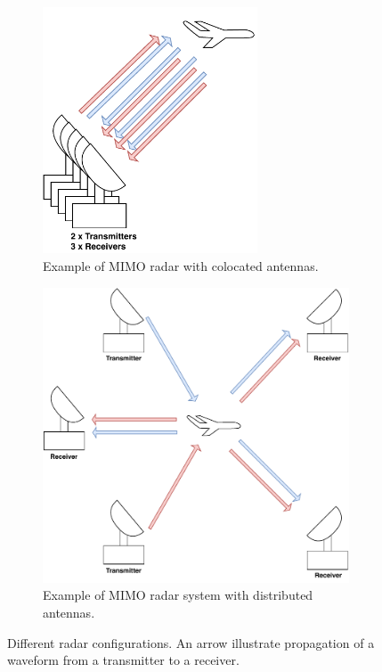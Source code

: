 \documentclass[english, 12pt, a4paper, elec, utf8, a-1b, online]{aaltothesis}
\numberwithin{equation}{section}
\begin{document}
\begin{figure}[htb]
\begin{subfigure}[b]{0.45\textwidth}
        \includegraphics[width=0.7\textwidth]{figures/background/radar_types_colocated_MIMO.pdf}
        \caption{Example of MIMO radar with colocated antennas.}
        \label{fig:colocated_MIMO_radar}
    \end{subfigure}
    \hfill
    \begin{subfigure}[b]{0.45\textwidth}
        \includegraphics[width=\textwidth]{figures/background/radar_types_distributed_MIMO.pdf}
        \caption{Example of MIMO radar system with distributed antennas.}
        \label{fig:distributed_MIMO_radar}
    \end{subfigure}
    \caption{Different radar configurations. An arrow illustrate propagation of a waveform from a transmitter to a receiver.}
    \label{fig:radar_types}
\end{figure}
\end{document}

